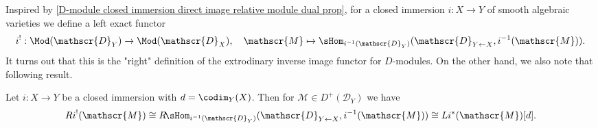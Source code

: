 Inspired by \cref{D-module closed immersion direct image relative module dual prop}, for a closed immersion $i:X\to Y$ of smooth algebraic varieties we define a left exact functor
\[i^!:\Mod(\mathscr{D}_Y)\to\Mod(\mathscr{D}_X),\quad \mathscr{M}\mapsto \sHom_{i^{-1}(\mathscr{D}_Y)}(\mathscr{D}_{Y\leftarrow X},i^{-1}(\mathscr{M})).\]
It turns out that this is the "right" definition of the extrodinary inverse image functor for $D$-modules. On the other hand, we also note that following result.
\begin{proposition}\label{D-module upper shriek for closed immersion char}
Let $i:X\to Y$ be a closed immersion with $d=\codim_Y(X)$. Then for $\mathscr{M}\in D^+(\mathscr{D}_Y)$ we have
\[Ri^!(\mathscr{M})\cong R\!\sHom_{i^{-1}(\mathscr{D}_Y)}(\mathscr{D}_{Y\leftarrow X},i^{-1}(\mathscr{M}))\cong Li^*(\mathscr{M})[d].\]
\end{proposition}
